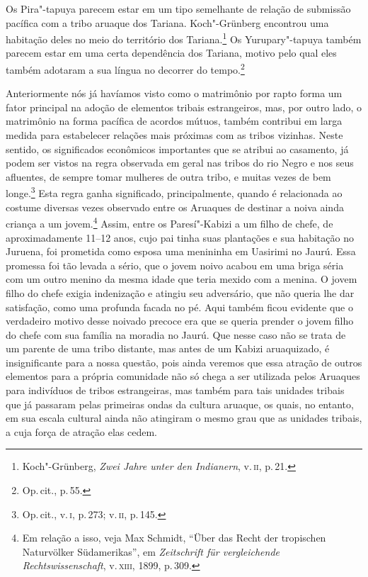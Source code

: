 Os Pira"-tapuya parecem estar em um tipo semelhante de relação de
submissão pacífica com a tribo aruaque dos Tariana. Koch"-Grünberg
encontrou uma habitação deles no meio do território dos
Tariana.\footnote{Koch"-Grünberg, \textit{Zwei Jahre unter den Indianern},
  v.\,\textsc{ii}, p.\,21.} Os Yurupary"-tapuya também parecem estar em uma certa
dependência dos Tariana, motivo pelo qual eles também adotaram a sua
língua no decorrer do tempo.\footnote{Op.\,cit., p.\,55.}

Anteriormente nós já havíamos visto como o matrimônio por rapto forma um
fator principal na adoção de elementos tribais estrangeiros, mas, por
outro lado, o matrimônio na forma pacífica de acordos mútuos, também
contribui em larga medida para estabelecer relações mais próximas com as
tribos vizinhas. Neste sentido, os significados econômicos importantes
que se atribui ao casamento, já podem ser vistos na regra observada em
geral nas tribos do rio Negro e nos seus afluentes, de sempre tomar
mulheres de outra tribo, e muitas vezes de bem longe.\footnote{Op.\,cit.,
  v.\,\textsc{i}, p.\,273; v.\,\textsc{ii}, p.\,145.} Esta regra ganha significado,
principalmente, quando é relacionada ao costume diversas vezes observado
entre os Aruaques de destinar a noiva ainda criança a um jovem.\footnote{Em
  relação a isso, veja Max Schmidt, ``Über das Recht der tropischen
  Naturvölker Südamerikas'', em \textit{Zeitschrift für vergleichende
  Rechtswissenschaft}, v.\,\textsc{xiii}, 1899, p.\,309.} Assim, entre os
Paresí"-Kabizi a um filho de chefe, de aproximadamente 11--12 anos, cujo
pai tinha suas plantações e sua habitação no Juruena, foi prometida
como esposa uma menininha em Uasirimi no Jaurú. Essa promessa foi tão
levada a sério, que o jovem noivo acabou em uma briga séria com um outro
menino da mesma idade que teria mexido com a menina. O jovem filho do
chefe exigia indenização e atingiu seu adversário, que não queria lhe
dar satisfação, como uma profunda facada no pé. Aqui também ficou
evidente que o verdadeiro motivo desse noivado precoce era que se queria
prender o jovem filho do chefe com sua família na moradia no Jaurú. Que
nesse caso não se trata de um parente de uma tribo distante, mas antes
de um Kabizi aruaquizado, é insignificante para a nossa questão, pois
ainda veremos que essa atração de outros elementos para a própria
comunidade não só chega a ser utilizada pelos Aruaques para indivíduos de
tribos estrangeiras, mas também para tais unidades tribais que já
passaram pelas primeiras ondas da cultura aruaque, os quais, no
entanto, em sua escala cultural ainda não atingiram o mesmo grau que as
unidades tribais, a cuja força de atração elas cedem.

